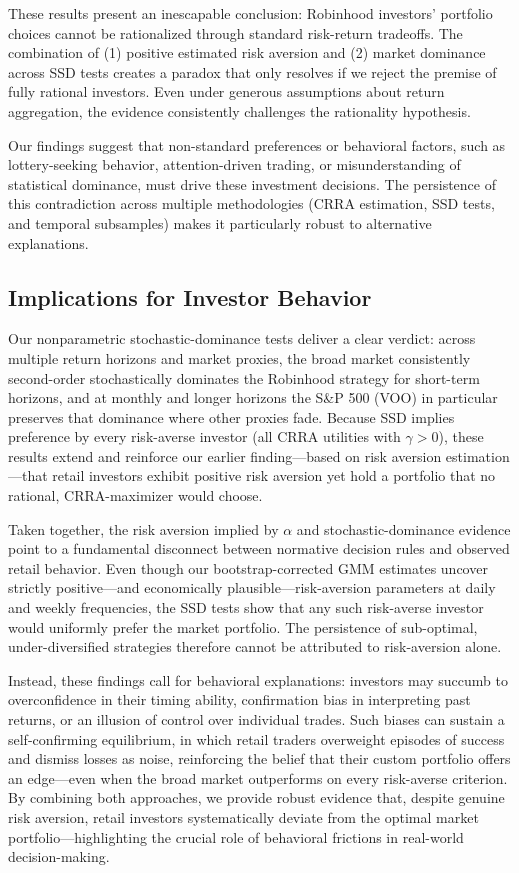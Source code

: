 These results present an inescapable conclusion: Robinhood investors' portfolio choices cannot be rationalized through standard risk-return tradeoffs. 
The combination of (1) positive estimated risk aversion and (2) market dominance across SSD tests creates a paradox that only resolves if we reject the premise of fully rational investors.
Even under generous assumptions about return aggregation, the evidence consistently challenges the rationality hypothesis.

Our findings suggest that non-standard preferences or behavioral factors, such as lottery-seeking behavior, attention-driven trading, or misunderstanding of statistical dominance, must drive these investment decisions. 
The persistence of this contradiction across multiple methodologies (CRRA estimation, SSD tests, and temporal subsamples) makes it particularly robust to alternative explanations.


\subsection{Implications for Investor Behavior}

Our nonparametric stochastic-dominance tests deliver a clear verdict: across multiple return horizons and market proxies, the broad market consistently second-order stochastically dominates the Robinhood strategy for short-term horizons, and at monthly and longer horizons the S\&P 500 (VOO) in particular preserves that dominance where other proxies fade.  
Because SSD implies preference by every risk-averse investor (all CRRA utilities with $\gamma>0$), these results extend and reinforce our earlier finding—based on risk aversion estimation—that retail investors exhibit positive risk aversion yet hold a portfolio that no rational, CRRA-maximizer would choose.  

Taken together, the risk aversion implied by $\alpha$ and stochastic-dominance evidence point to a fundamental disconnect between normative decision rules and observed retail behavior.  
Even though our bootstrap-corrected GMM estimates uncover strictly positive—and economically plausible—risk-aversion parameters at daily and weekly frequencies, 
the SSD tests show that any such risk-averse investor would uniformly prefer the market portfolio.  
The persistence of sub-optimal, under-diversified strategies therefore cannot be attributed to risk-aversion alone.

Instead, these findings call for behavioral explanations: investors may succumb to overconfidence in their timing ability, confirmation bias in interpreting past returns, or an illusion of control over individual trades.  
Such biases can sustain a self-confirming equilibrium, in which retail traders overweight episodes of success and dismiss losses as noise, reinforcing the belief that their custom portfolio offers an edge—even when the broad market outperforms on every risk-averse criterion.
By combining both approaches, we provide robust evidence that, despite genuine risk aversion, retail investors systematically deviate from the optimal market portfolio—highlighting the crucial role of behavioral frictions in real-world decision-making.  
